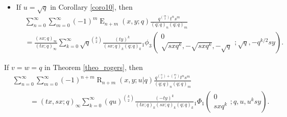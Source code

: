 \documentclass{cimart}
\DeclareMathOperator{\opE}{E}
\DeclareMathOperator{\opR}{R}
\begin{document}
\begin{itemize}
    \item 
If $u=\sqrt{q}$ in Corollary \ref{coro10}, then
    \begin{align}
    &\sum_{n=0}^{\infty}\sum_{m=0}^{\infty}(-1)^m\opE_{n+m}(x,y;q)\frac{q^{\binom{m}{2}}t^{n}s^{m}}{(q;q)_{n}(q;q)_{m}}\nonumber\\
        &=\frac{(sx;q)_{\infty}}{(tx;q)_{\infty}}\sum_{k=0}^{\infty}\sqrt{q}^{\binom{k}{2}}\frac{(ty)^k}{(sx;q)_{k}(q;q)_{k}}{}_{1}\phi_{3}\left(
        \begin{array}{c}
             0 \\
             \sqrt{sxq^k},-\sqrt{sxq^k},-\sqrt{q}
        \end{array};
        \sqrt{q},-q^{k/2}sy
        \right).
\end{align}
\end{itemize}

\begin{corollary}\label{coro24}
If $v=w=q$ in Theorem \ref{theo_rogers}, then
\begin{align}
    &\sum_{n=0}^{\infty}\sum_{m=0}^{\infty}(-1)^{n+m}\opR_{n+m}(x,y;u|q)\frac{q^{\binom{n}{2}+\binom{m}{2}}t^{n}s^{m}}{(q;q)_{n}(q;q)_{m}}\nonumber\\
        &\hspace{1cm}=(tx,sx;q)_{\infty}\sum_{k=0}^{\infty}(qu)^{\binom{k}{2}}\frac{(-ty)^k}{(tx;q)_{k}(sx;q)_{k}(q;q)_{k}}{}_{1}\Phi_{1}\left(
        \begin{array}{c}
             0 \\
             sxq^k
        \end{array};
        q,u,u^ksy
        \right).
\end{align}
\end{corollary}
\end{document}
